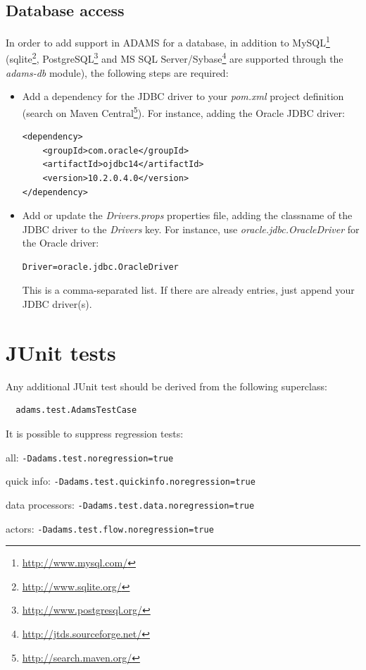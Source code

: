 \section{Database access}
In order to add support in ADAMS for a database, in addition to MySQL\footnote{\url{http://www.mysql.com/}{}} 
(sqlite\footnote{\url{http://www.sqlite.org/}{}}, PostgreSQL\footnote{\url{http://www.postgresql.org/}{}}
and MS SQL Server/Sybase\footnote{\url{http://jtds.sourceforge.net/}{}} are supported through the \textit{adams-db}
module), the following steps are required:
\begin{itemize}
	\item Add a dependency for the JDBC driver to your \textit{pom.xml} project
	definition (search on Maven Central\footnote{\url{http://search.maven.org/}{}}). 
	For instance, adding the Oracle JDBC driver: \\
\begin{verbatim}
<dependency>
    <groupId>com.oracle</groupId>
    <artifactId>ojdbc14</artifactId>
    <version>10.2.0.4.0</version>
</dependency>
\end{verbatim}
	\item Add or update the \textit{Drivers.props} properties file, adding
	the classname of the JDBC driver to the \textit{Drivers} key. For instance,
	use \textit{oracle.jdbc.OracleDriver} for the Oracle driver: \\
\begin{verbatim}
Driver=oracle.jdbc.OracleDriver
\end{verbatim}
	This is a comma-separated list. If there are already entries, just append
	your JDBC driver(s).
\end{itemize}

\chapter{JUnit tests}
Any additional JUnit test should be derived from the following superclass:
\begin{verbatim}
  adams.test.AdamsTestCase
\end{verbatim}

It is possible to suppress regression tests:
\begin{tight_itemize}
	\item all: \texttt{-Dadams.test.noregression=true}
	\item quick info: \texttt{-Dadams.test.quickinfo.noregression=true}
	\item data processors: \texttt{-Dadams.test.data.noregression=true}
	\item actors: \texttt{-Dadams.test.flow.noregression=true}
\end{tight_itemize}

